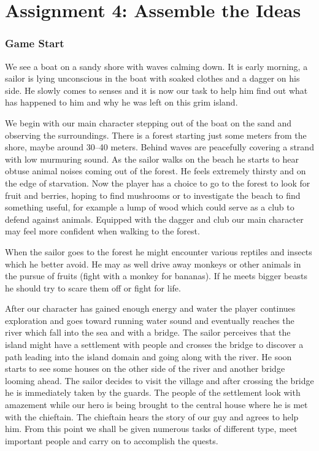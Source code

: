 \documentclass{article}
\begin{document}
\section*{Assignment 4: Assemble the Ideas}

\subsubsection*{Game Start}

We see a boat on a sandy shore with waves calming down. It is early morning, a
sailor is lying unconscious in the boat with soaked clothes and a dagger on his
side. He slowly comes to senses and it is now our task to help him find out what
has happened to him and why he was left on this grim island.

We begin with our main character stepping out of the boat on the sand and
observing the surroundings. There is a forest starting just some meters from the
shore, maybe around 30--40 meters. Behind waves are peacefully covering a
strand with low murmuring sound. As the sailor walks on the beach he starts to
hear obtuse animal noises coming out of the forest. He feels extremely thirsty
and on the edge of starvation. Now the player has a choice to go to the forest
to look for fruit and berries, hoping to find mushrooms or to investigate the
beach to find something useful, for example a lump of wood which could serve as
a club to defend against animals. Equipped with the dagger and club our main
character may feel more confident when walking to the forest.

When the sailor goes to the forest he might encounter various reptiles and
insects which he better avoid. He may as well drive away monkeys or other
animals in the pursue of fruits (fight with a monkey for bananas). If he meets
bigger beasts he should try to scare them off or fight for life.

After our character has gained enough energy and water the player continues
exploration and goes toward running water sound and eventually reaches the river
which fall into the sea and with a bridge. The sailor perceives that the island
might have a settlement with people and crosses the bridge to discover a path
leading into the island domain and going along with the river. He soon starts to
see some houses on the other side of the river and another bridge looming ahead.
The sailor decides to visit the village and after crossing the bridge he is
immediately taken by the guards. The people of the settlement look with
amazement while our hero is being brought to the central house where he is met
with the chieftain. The chieftain hears the story of our guy and agrees to help
him. From this point we shall be given numerous tasks of different type, meet
important people and carry on to accomplish the quests.
\end{document}
